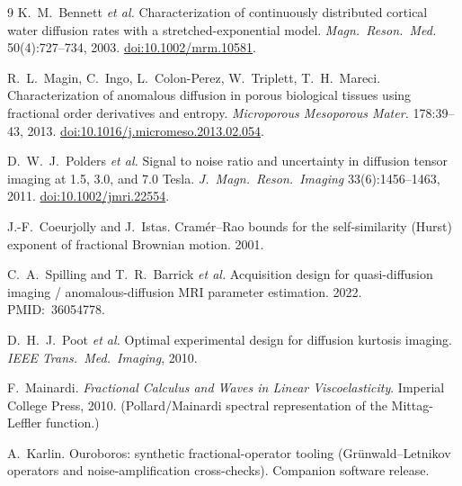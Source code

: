 \documentclass[11pt]{article}
\begin{document}
\begin{thebibliography}{9}
\small
{} K.~M.~Bennett \emph{et al.} Characterization of continuously distributed
cortical water diffusion rates with a stretched-exponential model. \emph{Magn.\ Reson.\ Med.}
50(4):727--734, 2003. \href{https://doi.org/10.1002/mrm.10581}{doi:10.1002/mrm.10581}.

 R.~L.~Magin, C.~Ingo, L.~Colon-Perez, W.~Triplett, T.~H.~Mareci.
Characterization of anomalous diffusion in porous biological tissues using fractional order
derivatives and entropy. \emph{Microporous Mesoporous Mater.} 178:39--43, 2013.
\href{https://doi.org/10.1016/j.micromeso.2013.02.054}{doi:10.1016/j.micromeso.2013.02.054}.

 D.~W.~J.~Polders \emph{et al.} Signal to noise ratio and uncertainty in
diffusion tensor imaging at 1.5, 3.0, and 7.0 Tesla. \emph{J.\ Magn.\ Reson.\ Imaging}
33(6):1456--1463, 2011. \href{https://doi.org/10.1002/jmri.22554}{doi:10.1002/jmri.22554}.

 J.-F.~Coeurjolly and J.~Istas. Cram\'er--Rao bounds for the
self-similarity (Hurst) exponent of fractional Brownian motion. 2001.

 C.~A.~Spilling and T.~R.~Barrick \emph{et al.} Acquisition design for
quasi-diffusion imaging / anomalous-diffusion MRI parameter estimation. 2022. PMID:~36054778.

 D.~H.~J.~Poot \emph{et al.} Optimal experimental design for diffusion kurtosis
imaging. \emph{IEEE Trans.\ Med.\ Imaging}, 2010.

 F.~Mainardi. \emph{Fractional Calculus and Waves in Linear
Viscoelasticity}. Imperial College Press, 2010. (Pollard/Mainardi spectral representation of the
Mittag-Leffler function.)

 A.~Karlin. Ouroboros: synthetic fractional-operator tooling
(Gr\"unwald--Letnikov operators and noise-amplification cross-checks). Companion software release.
\end{thebibliography}
\end{document}

